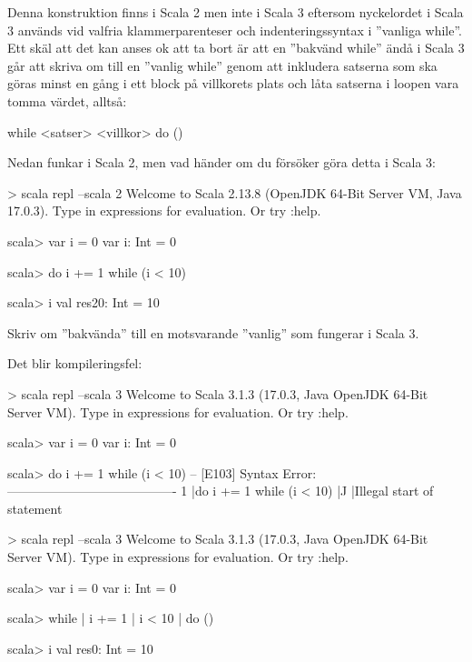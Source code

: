 Denna konstruktion finns i Scala 2 men inte i Scala 3 eftersom nyckelordet  i Scala 3 används vid valfria klammerparenteser och indenteringssyntax i ''vanliga while''. Ett skäl att det kan anses ok att ta bort  är att en ''bakvänd while'' ändå i Scala 3 går att skriva om till en ''vanlig while'' genom att inkludera satserna som ska göras minst en gång i ett block på villkorets plats och låta satserna i loopen vara tomma värdet, alltså:
\begin{Code}
while 
  <satser>
  <villkor>
do ()  
\end{Code}

\Subtask Nedan funkar i Scala 2, men vad händer om du försöker göra detta i Scala 3:
\begin{REPLnonum}
> scala repl --scala 2
Welcome to Scala 2.13.8 (OpenJDK 64-Bit Server VM, Java 17.0.3).
Type in expressions for evaluation. Or try :help.

scala> var i = 0
var i: Int = 0

scala> do i += 1 while (i < 10)

scala> i
val res20: Int = 10
\end{REPLnonum}

\Subtask Skriv om ''bakvända''  till en motsvarande ''vanlig''  som fungerar i Scala 3.


\SOLUTION

\TaskSolved \what

\SubtaskSolved Det blir kompileringsfel:
\begin{REPLnonum}
> scala repl --scala 3
Welcome to Scala 3.1.3 (17.0.3, Java OpenJDK 64-Bit Server VM).
Type in expressions for evaluation. Or try :help.
                                                                                    
scala> var i = 0
var i: Int = 0
                                                                                    
scala> do i += 1 while (i < 10)
-- [E103] Syntax Error: ----------------------------------------
1 |do i += 1 while (i < 10)
  |^^
  |Illegal start of statement
\end{REPLnonum}

\SubtaskSolved 
\begin{REPLnonum}
> scala repl --scala 3
Welcome to Scala 3.1.3 (17.0.3, Java OpenJDK 64-Bit Server VM).
Type in expressions for evaluation. Or try :help.

scala> var i = 0
var i: Int = 0

scala> while
     |   i += 1
     |   i < 10
     | do ()

scala> i
val res0: Int = 10
\end{REPLnonum}



